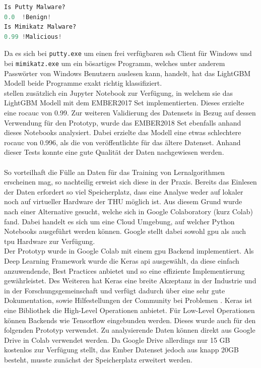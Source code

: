 \documentclass[
    12pt, %
    DIV10,
    ngerman, %
    a4paper, %
    oneside, %
    titlepage, %
    parskip=half, %
    headings=normal, %
    listof=totoc, %
    bibliography=totoc, %
    index=totoc, %
    captions=tableheading, %
    final %
]{scrreprt}
\begin{document}
\begin{lstlisting}[language=Python, caption=Ergebnis Python Testskript]
Is Putty Malware?
0.0  !Benign!
Is Mimikatz Malware?
0.99 !Malicious!
\end{lstlisting}
Da es sich bei \texttt{putty.exe} um einen frei verfügbaren \ac{ssh} Client für Windows und bei \texttt{mimikatz.exe} um ein bösartiges Programm, welches unter anderem Passwörter von Windows Benutzern auslesen kann, handelt, hat das LightGBM Modell beide Programme exakt richtig klassifiziert.\\
\textcite{anderson2018ember} stellen zusätzlich ein Jupyter Notebook zur Verfügung, in welchem sie das  LightGBM Modell mit dem EMBER2017 Set implementierten. Dieses erzielte eine \ac{rocauc} von 0.99. Zur weiteren Validierung des Datensets in Bezug auf dessen Verwendung für den Prototyp, wurde das EMBER2018 Set ebenfalls anhand dieses Notebooks analysiert. Dabei erzielte das Modell eine etwas schlechtere \ac{rocauc} von 0.996, als die von \textcite{anderson2018ember} veröffentlichte für das ältere Datenset. Anhand dieser Tests konnte eine gute Qualität der Daten nachgewiesen werden.\\\\
So vorteilhaft die Fülle an Daten für das Training von Lernalgorithmen erscheinen mag, so nachteilig erweist sich diese in der Praxis.
Bereits das Einlesen der Daten erfordert so viel Speicherplatz, dass eine Analyse weder auf lokaler noch auf virtueller Hardware der THU möglich ist. 
Aus diesem Grund wurde nach einer Alternative gesucht, welche sich in Google Colaboratory (kurz Colab) fand. Dabei handelt es sich um eine Cloud Umgebung, auf welcher Python Notebooks ausgeführt werden können. Google stellt dabei sowohl \ac{gpu} als auch \ac{tpu} Hardware zur Verfügung.\\
Der Prototyp wurde in Google Colab mit einem \ac{gpu} Backend implementiert. Als Deep Learning Framework wurde die Keras \ac{api} ausgewählt, da diese einfach anzuwendende, Best Practices anbietet und so eine effiziente Implementierung gewährleistet. Des Weiteren hat Keras eine breite Akzeptanz in der Industrie und in der Forschungsgemeinschaft und verfügt dadurch über eine sehr gute Dokumentation, sowie Hilfestellungen der Community bei Problemen \parencite{Keras}. Keras ist eine Bibliothek die High-Level Operationen anbietet. Für Low-Level Operationen können Backends wie Tensorflow eingebunden werden. Dieses wurde auch für den folgenden Prototyp verwendet. Zu analysierende Daten können direkt aus Google Drive in Colab verwendet werden. Da Google Drive allerdings nur 15 GB kostenlos zur Verfügung stellt, das Ember Datenset jedoch aus knapp 20GB besteht, musste zunächst der Speicherplatz erweitert werden. 
\end{document}
